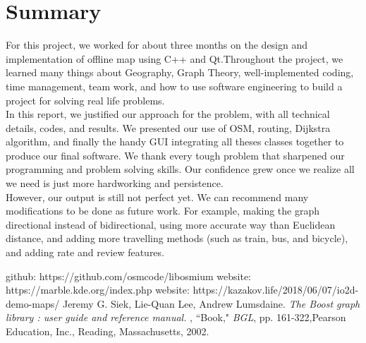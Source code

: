 \documentclass[a4paper, 12pt, english]{book}
\begin{document}
\chapter{Summary}
For this project, we worked for about three months on the design and implementation of offline map using C++ and Qt.Throughout the project, we learned many things about Geography, Graph Theory, well-implemented coding, time management, team work, and how to use software engineering to build a project for solving real life problems.\\
In this report, we justified our approach for the problem, with all technical details, codes, and results. We presented our use of OSM, routing, Dijkstra algorithm, and finally the handy GUI integrating all theses classes
together to produce our final software.
We thank every tough problem that sharpened our programming and problem solving
skills. Our confidence grew once we realize all we need is just more hardworking and persistence.\\
However, our output is still not perfect yet. We can recommend many modifications
to be done as future work. For example, making the graph directional instead of bidirectional, using more accurate way than Euclidean distance, and adding more travelling methods (such as train, bus, and bicycle), and adding rate and review features.


\begin{thebibliography}{12}
github: https://github.com/osmcode/libosmium
website: https://marble.kde.org/index.php
website: https://kazakov.life/2018/06/07/io2d-demo-maps/
Jeremy G. Siek,
Lie-Quan Lee, Andrew Lumsdaine.
\textit{The Boost graph library : user guide and reference manual.} , ``Book," \emph{BGL}, pp. 161-322,Pearson Education, Inc., Reading, Massachusetts, 2002.
\end{thebibliography}
\end{document}
